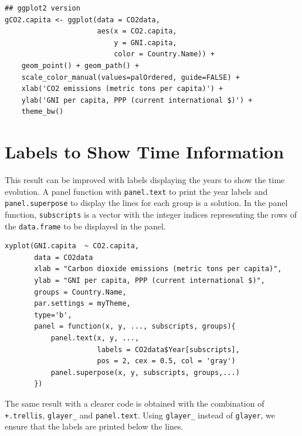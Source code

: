 \lstset{language=r,label= ,caption= ,captionpos=b,numbers=none}
\begin{lstlisting}
## ggplot2 version
gCO2.capita <- ggplot(data = CO2data,
                      aes(x = CO2.capita,
                          y = GNI.capita,
                          color = Country.Name)) +
    geom_point() + geom_path() +
    scale_color_manual(values=palOrdered, guide=FALSE) +
    xlab('CO2 emissions (metric tons per capita)') +
    ylab('GNI per capita, PPP (current international $)') +
    theme_bw()
\end{lstlisting}

\section{Labels to Show Time Information}
\label{sec:org5a88b13}
This result can be improved with labels displaying the years to show
the time evolution.  A panel function with \texttt{panel.text} to print the
year labels and \texttt{panel.superpose} to display the lines for each group
is a solution. In the panel function, \texttt{subscripts} is a vector with
the integer indices representing the rows of the \texttt{data.frame} to be
displayed in the panel.



\lstset{language=r,label= ,caption= ,captionpos=b,numbers=none}
\begin{lstlisting}
xyplot(GNI.capita  ~ CO2.capita,
       data = CO2data
       xlab = "Carbon dioxide emissions (metric tons per capita)",
       ylab = "GNI per capita, PPP (current international $)",
       groups = Country.Name,
       par.settings = myTheme,
       type='b',
       panel = function(x, y, ..., subscripts, groups){
           panel.text(x, y, ...,
                      labels = CO2data$Year[subscripts],
                      pos = 2, cex = 0.5, col = 'gray')
           panel.superpose(x, y, subscripts, groups,...)
       })
\end{lstlisting}

The same result with a clearer code is obtained with the combination
of \texttt{+.trellis}, \texttt{glayer\_} and \texttt{panel.text}. Using \texttt{glayer\_} instead of
\texttt{glayer}, we ensure that the labels are printed below the lines.


